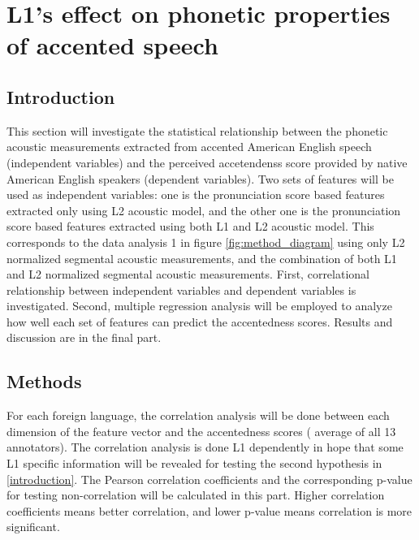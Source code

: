 \chapter{L1's effect on phonetic properties of accented speech}
\label{l1_seg}

\section{Introduction}

This section will investigate the statistical relationship between the phonetic acoustic measurements extracted from accented American English speech (independent variables) and the perceived accetendenss score provided by native American English speakers (dependent variables). Two sets of features will be used as independent variables: one is the pronunciation score based features extracted only using L2 acoustic model, and the other one is the pronunciation score based features extracted using both L1 and L2 acoustic model. This corresponds to the data analysis 1 in figure \ref{fig:method_diagram} using only L2 normalized segmental acoustic measurements, and the combination of  both L1 and L2 normalized segmental acoustic measurements. First, correlational relationship between independent variables and dependent variables is investigated. Second, multiple regression analysis will be employed to analyze how well each set of features can predict the accentedness scores. Results and discussion are in the final part.

\section{Methods}


For each foreign language, the correlation analysis will be done between each dimension of the feature vector and the accentedness scores ( average of all 13 annotators). The correlation analysis is done L1 dependently in hope that some L1 specific information will be revealed for testing the second hypothesis in \ref{introduction}. The Pearson correlation coefficients and the corresponding p-value for testing non-correlation will be calculated in this part. Higher correlation coefficients means better correlation, and lower p-value means correlation is more significant.

